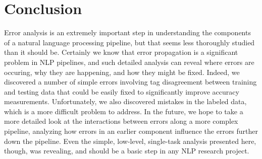 \documentclass[12pt]{article}
\begin{document}
\section{Conclusion}
Error analysis is an extremely important step in understanding the components of a natural language processing pipeline, but that seems less thoroughly studied than it should be. Certainly we know that error propagation is a significant problem in NLP pipelines, and such detailed analysis can reveal where errors are occuring, why they are happening, and how they might be fixed. Indeed, we discovered a number of simple errors involving tag disagreement between training and testing data that could be easily fixed to significantly improve accuracy measurements. Unfortunately, we also discovered mistakes in the labeled data, which is a more difficult problem to address. In the future, we hope to take a more detailed look at the interactions between errors along a more complex pipeline, analyzing how errors in an earlier component influence the errors further down the pipeline. Even the simple, low-level, single-task analysis presented here, though, was revealing, and should be a basic step in any NLP research project.




\end{document}

